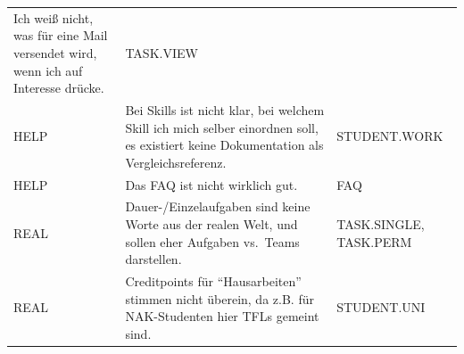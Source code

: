 \documentclass[
  12pt,
  ngerman,
  a4paper,
]{article}
\begin{document}
\begin{longtable}[]{@{}lll@{}}
\begin{minipage}[t]{0.49\columnwidth}
Ich weiß nicht, was für eine Mail versendet wird, wenn ich auf Interesse
drücke.\strut
\end{minipage} & \begin{minipage}[t]{0.27\columnwidth}\raggedright
TASK.VIEW\strut
\end{minipage}\tabularnewline
\begin{minipage}[t]{0.15\columnwidth}\raggedright
HELP\strut
\end{minipage} & \begin{minipage}[t]{0.49\columnwidth}\raggedright
Bei Skills ist nicht klar, bei welchem Skill ich mich selber einordnen
soll, es existiert keine Dokumentation als Vergleichsreferenz.\strut
\end{minipage} & \begin{minipage}[t]{0.27\columnwidth}\raggedright
STUDENT.WORK\strut
\end{minipage}\tabularnewline
\begin{minipage}[t]{0.15\columnwidth}\raggedright
HELP\strut
\end{minipage} & \begin{minipage}[t]{0.49\columnwidth}\raggedright
Das FAQ ist nicht wirklich gut.\strut
\end{minipage} & \begin{minipage}[t]{0.27\columnwidth}\raggedright
FAQ\strut
\end{minipage}\tabularnewline
\begin{minipage}[t]{0.15\columnwidth}\raggedright
REAL\strut
\end{minipage} & \begin{minipage}[t]{0.49\columnwidth}\raggedright
Dauer-/Einzelaufgaben sind keine Worte aus der realen Welt, und sollen
eher Aufgaben vs.~Teams darstellen.\strut
\end{minipage} & \begin{minipage}[t]{0.27\columnwidth}\raggedright
TASK.SINGLE, TASK.PERM\strut
\end{minipage}\tabularnewline
\begin{minipage}[t]{0.15\columnwidth}\raggedright
REAL\strut
\end{minipage} & \begin{minipage}[t]{0.49\columnwidth}\raggedright
Creditpoints für ``Hausarbeiten'' stimmen nicht überein, da z.B. für
NAK-Studenten hier TFLs gemeint sind.\strut
\end{minipage} & \begin{minipage}[t]{0.27\columnwidth}\raggedright
STUDENT.UNI\strut
\end{minipage}\tabularnewline

\end{longtable}
\end{document}
